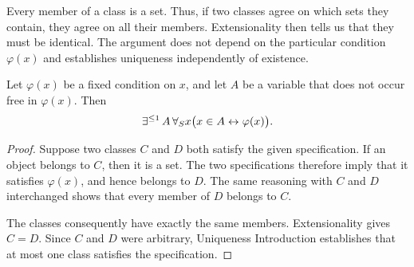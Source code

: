 Every member of a class is a set. Thus, if two classes agree on
which sets they contain, they agree on all their members.
Extensionality then tells us that they must be identical.
The argument does not depend on the particular condition
\(\varphi(x)\) and establishes uniqueness independently of existence.

\begin{proposition}
\label{prop:uniqueness-class-specification}
Let \(\varphi(x)\) be a fixed condition on \(x\), and let
\(A\) be a variable that does not occur free in \(\varphi(x)\).
Then
\[
\mathop{\exists^{\leq 1}} A\,\forall_S x
\bigl(x\in A\leftrightarrow\varphi(x)\bigr).
\]
\end{proposition}

\begin{proof}
Suppose two classes \(C\) and \(D\) both satisfy the given
specification. If an object belongs to \(C\), then it is a set.
The two specifications therefore imply that it satisfies
\(\varphi(x)\), and hence belongs to \(D\). The same reasoning
with \(C\) and \(D\) interchanged shows that every member of
\(D\) belongs to \(C\).

The classes consequently have exactly the same members.
Extensionality gives \(C=D\). Since \(C\) and \(D\) were arbitrary,
Uniqueness Introduction establishes that at most one class satisfies
the specification.
\end{proof}

